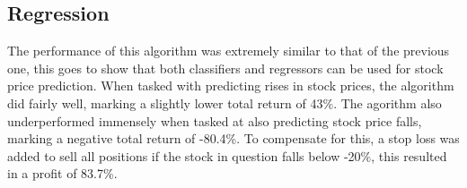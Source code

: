 \subsection{Regression}
The performance of this algorithm was extremely similar to that of the previous one, this goes to show that both classifiers and regressors can be used for stock price prediction. When tasked with predicting rises in stock prices, the algorithm did fairly well, marking a slightly lower total return of 43\%. The agorithm also underperformed immensely when tasked at also predicting stock price falls, marking a negative total return of -80.4\%. To compensate for this, a stop loss was added to sell all positions if the stock in question falls below -20\%, this resulted in a profit of 83.7\%.

